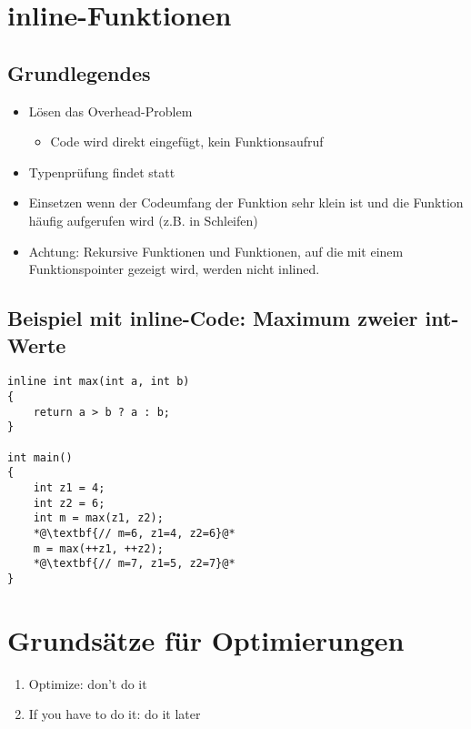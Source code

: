 \section{inline-Funktionen}
\label{sec:inline}

\begin{multicols}{2}
\subsection{Grundlegendes}
\begin{itemize}
	\item Lösen das Overhead-Problem
	\begin{itemize}
		\item Code wird direkt eingefügt, kein Funktionsaufruf
	\end{itemize}
	\item Typenprüfung findet statt
	\item Einsetzen wenn der Codeumfang der Funktion sehr klein ist und die Funktion häufig aufgerufen wird (z.B. in Schleifen)
	\item Achtung: Rekursive Funktionen und Funktionen, auf die mit einem Funktionspointer gezeigt wird, werden nicht inlined.
\end{itemize}
\vfill\null
\columnbreak
\subsection{Beispiel mit inline-Code: Maximum zweier int-Werte}
\vspace{-\baselineskip}
\begin{minipage}{\linewidth}
\begin{lstlisting}
inline int max(int a, int b)
{
	return a > b ? a : b;
}

int main()
{
	int z1 = 4;
	int z2 = 6;
	int m = max(z1, z2);
	*@\textbf{// m=6, z1=4, z2=6}@*
	m = max(++z1, ++z2);
	*@\textbf{// m=7, z1=5, z2=7}@*
}
\end{lstlisting}
\end{minipage}
\end{multicols}

\section{Grundsätze für Optimierungen}
\begin{enumerate}
	\item Optimize: don't do it
	\item If you have to do it: do it later
\end{enumerate} 

